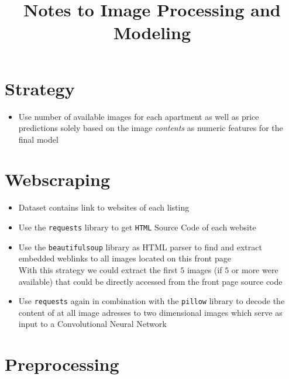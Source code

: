 \documentclass[12pt, letterpaper]{article}
\title{Notes to Image Processing and Modeling}
\author{}
\date{}
\begin{document}
\maketitle
\tableofcontents
\setcounter{tocdepth}{3}

\section{Strategy}

\begin{itemize}
    \item Use number of available images for each apartment as well as price predictions solely based on the image \emph{contents} as numeric features for the final model
\end{itemize}


\section{Webscraping}

\begin{itemize}
    \item Dataset contains link to websites of each listing
    \item Use the \texttt{requests} library to get \texttt{HTML} Source Code of each website
    \item Use the \texttt{beautifulsoup} library as HTML parser to find and extract embedded weblinks to all images located on this front page \\
          With this strategy we could extract the first $5$ images (if $5$ or more were available) that could be directly accessed from the front page source code
    \item Use \texttt{requests} again in combination with the \texttt{pillow} library to decode the content of at all image adresses to two dimensional images which serve as input to a Convolutional Neural Network
\end{itemize}


\section{Preprocessing}
\end{document}
